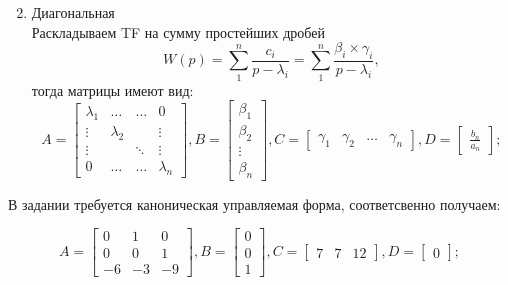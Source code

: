 \documentclass[16pt]{article}
\begin{document}
\begin{enumerate}
\[    \]
    \item Диагональная\\
    Раскладываем TF на сумму простейших дробей
    \[
      W(p) = \sum_1^n\frac{c_i}{p - \lambda_i} = \sum_1^n\frac{\beta_i \times \gamma_i}{p - \lambda_i}, 
    \]
    тогда матрицы имеют вид:
    \[ A = \begin{bmatrix}
        \lambda_1 & \hdots & \hdots & 0 \\
        \vdots & \lambda_2 &  & \vdots  \\
        \vdots &  & \ddots & \vdots  \\
        0 & \hdots & \hdots & \lambda_n
        \end{bmatrix},
        B = \begin{bmatrix}
            \beta_1 \\
            \beta_2 \\
            \vdots \\
            \beta_n
            \end{bmatrix},
        C = \begin{bmatrix}
            \gamma_1 & \gamma_2 & \hdots & \gamma_n
            \end{bmatrix},
        D = \begin{bmatrix}
            \frac{b_n}{a_n}
            \end{bmatrix};
    \]
\end{enumerate}
В задании требуется каноническая управляемая форма, соответсвенно получаем:

\[ A = \begin{bmatrix}
    0 &  1 & 0 \\
    0 &  0 & 1\\
    -6 & -3 & -9 
    \end{bmatrix},
    B = \begin{bmatrix}
        0 \\
        0 \\
        1
        \end{bmatrix},
    C = \begin{bmatrix}
        7 & 7 & 12
        \end{bmatrix},
    D = \begin{bmatrix}
        0
        \end{bmatrix};
\]
\end{document}
